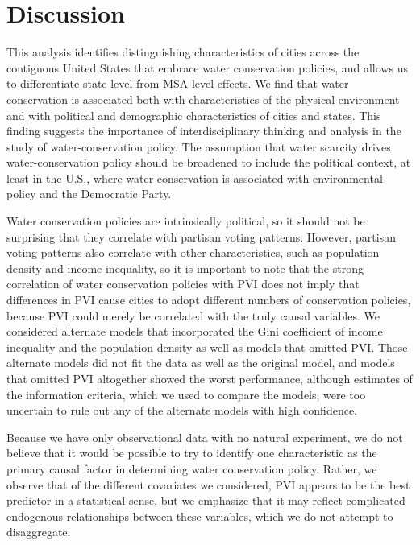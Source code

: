 \documentclass[draft,linenumbers]{agujournal}\usepackage{knitr}
\begin{document}
\section{Discussion}

This analysis identifies distinguishing characteristics of cities across the
contiguous United States that embrace water conservation policies, and allows us
to differentiate state-level from MSA-level effects. We find that water
conservation is associated both with characteristics of the physical environment
and with political and demographic
characteristics of cities and states.
This finding suggests the importance of interdisciplinary thinking and
analysis in the study of water-conservation policy. The assumption that
water scarcity drives water-conservation policy should be broadened to include
the political context, at least in the U.S., where water conservation is associated
with environmental policy and the Democratic Party.

Water conservation policies are intrinsically political, so it should not be surprising
that they correlate with partisan voting patterns. However, partisan voting patterns also
correlate with other characteristics, such as population density and income inequality,
so it is important to note that the strong correlation of water conservation policies with
PVI does not imply that differences in PVI cause cities to adopt different numbers of conservation
policies, because PVI could merely be correlated with the truly causal variables.
We considered alternate models that incorporated the Gini coefficient of income inequality
and the population density as well as models that omitted PVI. Those alternate models did not fit the data
as well as the original model, and models that omitted PVI altogether showed the worst performance,
although estimates of the information criteria, which we used to compare the models,
were too uncertain to rule out any of the alternate models with high confidence.

Because we have only observational data with no natural experiment, we do not believe
that it would be possible to try to identify one characteristic as the primary causal factor in
determining water conservation policy. Rather, we observe that of the different covariates we considered,
PVI appears to be the best predictor in a statistical sense, but we emphasize that it may reflect
complicated endogenous relationships between these variables, which we do not attempt to disaggregate.
\end{document}
